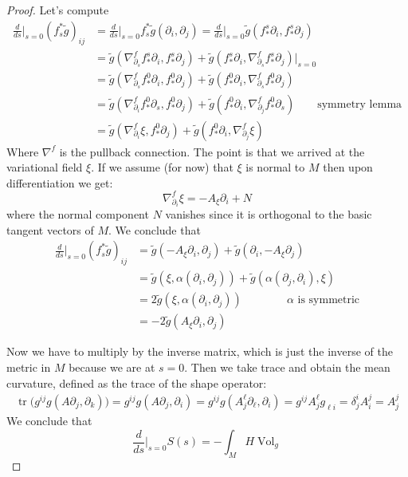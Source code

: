 \begin{proof}
Let's compute \begin{align*} \frac{d}{ds}\Big|_{s=0}(f_s^*\tilde{g})_{ij}
&=\frac{d}{ds}\Big|_{s=0}f_s^*\tilde{g}\left(\partial_i,\partial_j\right)
=\frac{d}{ds}\Big|_{s=0}\tilde{g}(f^s_*\partial_i,f^s_*\partial_j)\\
&=\tilde{g}\left(\nabla^f_{\partial_s}f^s_*\partial_i,f^s_*\partial_j\right)
+\tilde{g}
\left(f^s_*\partial_i,\nabla^f_{\partial_s}f_*^s\partial_j\right)\Big|_{s=0}\\
&=\tilde{g}\left(\nabla^f_{\partial_s}f^0_*\partial_i,f_*^0\partial_j\right)
+\tilde{g}\left(f^0_*\partial_i,\nabla^f_{\partial_s}f_*^0\partial_j\right)\\
&=\tilde{g}\left(\nabla^f_{\partial_i}f^0_*\partial_s,f_*^0\partial_j\right)
+\tilde{g}\left(f^0_*\partial_i,\nabla^f_{\partial_j}f_*^0\partial_s\right)
\qquad  \text{symmetry lemma} \\ &=\tilde{g}(\nabla^f_{\partial_i}\xi,
f_*^0\partial_j)
+\tilde{g}(f^0_*\partial_i,\nabla^f_{\partial_j}\xi)\end{align*} Where
$\nabla^f$ is the pullback connection. The point is that we arrived at the
variational field $\xi$. If we assume (for now) that $\xi$ is normal to $M$ then
upon differentiation we get: $$ \nabla^f_{\partial_i}\xi=-A_{\xi}\partial_i+N $$
where the normal component $N$ vanishes since it is orthogonal to the basic
tangent vectors of $M$. We conclude that
\begin{align*}
\frac{d}{ds}\Big|_{s=0}(f_s^*\tilde{g})_{ij}
&=\tilde{g}\left(-A_{\xi}\partial_i,\partial_j\right)
+\tilde{g}\left(\partial_i,-A_{\xi}\partial_j\right)\\
&=\tilde{g}(\xi,\alpha(\partial_i,\partial_j))
+\tilde{g}(\alpha(\partial_j,\partial_i),\xi)\\
&=2\tilde{g}(\xi,\alpha(\partial_i,\partial_j))\qquad\qquad \text{$\alpha$ is symmetric}\\
&=-2\tilde{g}(A_{\xi}\partial_i,\partial_j)
\end{align*}

Now we have to multiply by the inverse matrix, which is just the inverse of the
metric in $M$ because we are at $s=0$. Then we take trace and obtain the mean
curvature, defined as the trace of the shape operator:
\begin{align*}
\operatorname{tr}\Big(g^{ij}g(A \partial_j,\partial_k)\Big)
=g^{ij}g(A \partial_j,\partial_i)
=g^{ij}g(A^\ell_j\partial_\ell,\partial_i)
=g^{ij}A^\ell_jg_{\ell i}
=\delta^{i}_jA^j_i
=A^j_j
\end{align*}
We conclude that
$$
\frac{d}{ds}\Big|_{s=0}S(s)=-\int_M H \operatorname{Vol}_{g}
$$
\end{proof}



